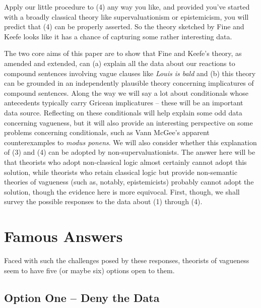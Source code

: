 \noindent Apply our little procedure to (4) any way you like, and provided you've started with a broadly classical theory like supervaluationism or epistemicism, you will predict that (4) can be properly asserted. So the theory sketched by Fine and Keefe looks like it has a chance of capturing some rather interesting data.

The two core aims of this paper are to show that Fine and Keefe's theory, as amended and extended, can (a) explain all the data about our reactions to compound sentences involving vague clauses like \textit{Louis is bald} and (b) this theory can be grounded in an independently plausible theory concerning implicatures of compound sentences. Along the way we will say a lot about conditionals whose antecedents typically carry Gricean implicatures -- these will be an important data source. Reflecting on these conditionals will help explain some odd data concerning vagueness, but it will also provide an interesting perspective on some problems concerning conditionals, such as Vann McGee's apparent counterexamples to \textit{modus ponens}. We will also consider whether this explanation of (3) and (4) can be adopted by non-supervaluationists. The answer here will be that theorists who adopt non-classical logic almost certainly cannot adopt this solution, while theorists who retain classical logic but provide non-semantic theories of vagueness (such as, notably, epistemicists) probably cannot adopt the solution, though the evidence here is more equivocal. First, though, we shall survey the possible responses to the data about (1) through (4).

\section{Famous Answers}

Faced with such the challenges posed by these responses, theorists of vagueness seem to have five (or maybe six) options open to them.

\subsection*{Option One -- Deny the Data}

